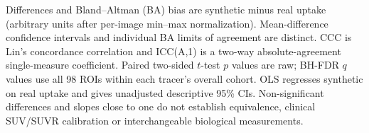 \documentclass{article}
\providecommand{\DIFaddtex}[1]{{\protect\color{blue} \sf #1}} %
\providecommand{\DIFaddFL}[1]{\DIFadd{#1}} %
\providecommand{\DIFadd}[1]{\texorpdfstring{\DIFaddtex{#1}}{#1}} %
\begin{document}
\begin{landscape}
\begin{table}[p]
{\begin{tabular}{llrccccccccc}
\bottomrule
\end{tabular}}
\par\smallskip\footnotesize
\DIFaddFL{Differences and Bland--Altman (BA) bias are synthetic minus real uptake (arbitrary units after per-image min--max normalization). Mean-difference confidence intervals and individual BA limits of agreement are distinct. CCC is Lin's concordance correlation and ICC(A,1) is a two-way absolute-agreement single-measure coefficient. Paired two-sided $t$-test $p$ values are raw; BH-FDR $q$ values use all 98 ROIs within each tracer's overall cohort. OLS regresses synthetic on real uptake and gives unadjusted descriptive 95\% CIs. Non-significant differences and slopes close to one do not establish equivalence, clinical SUV/SUVR calibration or interchangeable biological measurements.
}\end{table}
\end{landscape}

\end{document}

